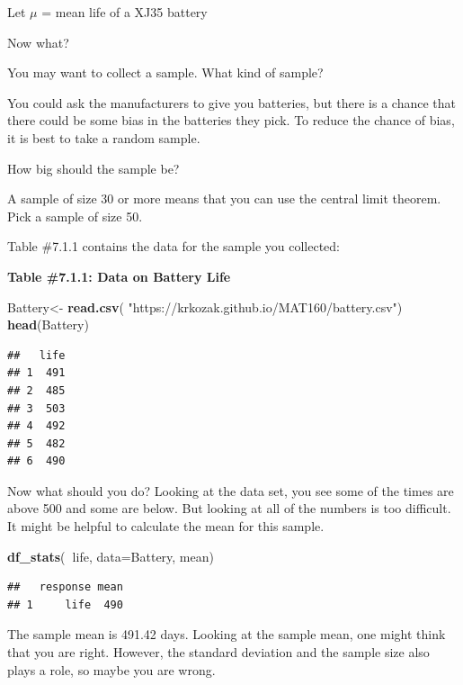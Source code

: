 \documentclass[
]{book}
\newenvironment{Shaded}{\begin{snugshade}}{\end{snugshade}}
\newcommand{\DataTypeTok}[1]{\textcolor[rgb]{0.13,0.29,0.53}{#1}}
\newcommand{\KeywordTok}[1]{\textcolor[rgb]{0.13,0.29,0.53}{\textbf{#1}}}
\newcommand{\NormalTok}[1]{#1}
\newcommand{\OperatorTok}[1]{\textcolor[rgb]{0.81,0.36,0.00}{\textbf{#1}}}
\newcommand{\StringTok}[1]{\textcolor[rgb]{0.31,0.60,0.02}{#1}}
\begin{document}
Let \(\mu\) = mean life of a XJ35 battery

Now what?

You may want to collect a sample. What kind of sample?

You could ask the manufacturers to give you batteries, but there is a chance that there could be some bias in the batteries they pick. To reduce the chance of bias, it is best to take a random sample.

How big should the sample be?

A sample of size 30 or more means that you can use the central limit theorem. Pick a sample of size 50.

Table \#7.1.1 contains the data for the sample you collected:

\textbf{Table \#7.1.1: Data on Battery Life}

\begin{Shaded}
\begin{Highlighting}[]
\NormalTok{Battery<-}\StringTok{ }\KeywordTok{read.csv}\NormalTok{(}
  \StringTok{"https://krkozak.github.io/MAT160/battery.csv"}\NormalTok{)}
\KeywordTok{head}\NormalTok{(Battery)}
\end{Highlighting}
\end{Shaded}

\begin{verbatim}
##   life
## 1  491
## 2  485
## 3  503
## 4  492
## 5  482
## 6  490
\end{verbatim}

Now what should you do? Looking at the data set, you see some of the times are above 500 and some are below. But looking at all of the numbers is too difficult. It might be helpful to calculate the mean for this sample.

\begin{Shaded}
\begin{Highlighting}[]
\KeywordTok{df_stats}\NormalTok{(}\OperatorTok{~}\NormalTok{life, }\DataTypeTok{data=}\NormalTok{Battery, mean)}
\end{Highlighting}
\end{Shaded}

\begin{verbatim}
##   response mean
## 1     life  490
\end{verbatim}

The sample mean is 491.42 days. Looking at the sample mean, one might think that you are right. However, the standard deviation and the sample size also plays a role, so maybe you are wrong.
\end{document}
